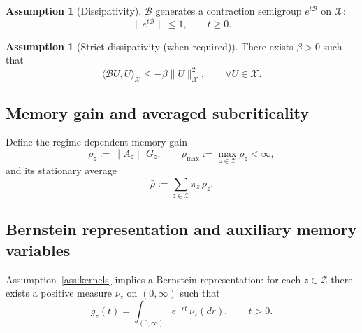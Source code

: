 \documentclass[12pt,a4paper]{article}
\theoremstyle{plain}
\theoremstyle{definition}
\newtheorem{assumption}[theorem]{Assumption}
\theoremstyle{remark}
\begin{document}
\begin{assumption}[Dissipativity]
	\label{ass:dissip}
	$\mathcal B$ generates a contraction semigroup $e^{t\mathcal B}$ on $\mathcal X$:
	\begin{equation}
		\label{eq:contraction}
		\|e^{t\mathcal B}\|\le 1,
		\qquad t\ge 0.
	\end{equation}
\end{assumption}

\begin{assumption}[Strict dissipativity (when required)]
	\label{ass:dissip-strong}
	There exists $\beta>0$ such that
	\begin{equation}
		\label{eq:strict-dissip}
		\langle \mathcal B U, U\rangle_{\mathcal X}\le -\beta\|U\|_{\mathcal X}^2,
		\qquad \forall U\in\mathcal X.
	\end{equation}
\end{assumption}

\subsection{Memory gain and averaged subcriticality}
\label{subsec:gain}

Define the regime-dependent memory gain
\begin{equation}
	\label{eq:rho-def}
	\rho_z := \|A_z\|\,G_z,
	\qquad
	\rho_{\max}:=\max_{z\in\mathcal Z}\rho_z<\infty,
\end{equation}
and its stationary average
\begin{equation}
	\label{eq:rho-bar}
	\bar\rho := \sum_{z\in\mathcal Z}\pi_z\,\rho_z.
\end{equation}

\subsection{Bernstein representation and auxiliary memory variables}
\label{subsec:bernstein}

Assumption~\ref{ass:kernels} implies a Bernstein representation: for each $z\in\mathcal Z$
there exists a positive measure $\nu_z$ on $(0,\infty)$ such that
\begin{equation}
	\label{eq:bernstein-rep}
	g_z(t)=\int_{(0,\infty)} e^{-rt}\,\nu_z(dr),
	\qquad t>0.
\end{equation}
\end{document}
